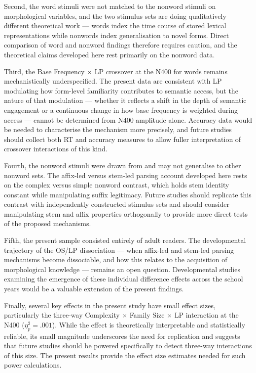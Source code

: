 \documentclass[utf8]{FrontiersinHarvard} %
\begin{document}
	Second, the word stimuli were not matched to the nonword stimuli on morphological variables, and the two stimulus sets are doing qualitatively different theoretical work --- words index the time course of stored lexical representations while nonwords index generalisation to novel forms. Direct comparison of word and nonword findings therefore requires caution, and the theoretical claims developed here rest primarily on the nonword data.
	
	Third, the Base Frequency $\times$ LP crossover at the N400 for words remains mechanistically underspecified. The present data are consistent with LP modulating how form-level familiarity contributes to semantic access, but the nature of that modulation --- whether it reflects a shift in the depth of semantic engagement or a continuous change in how base frequency is weighted during access --- cannot be determined from N400 amplitude alone. Accuracy data would be needed to characterise the mechanism more precisely, and future studies should collect both RT and accuracy measures to allow fuller interpretation of crossover interactions of this kind.
	
	Fourth, the nonword stimuli were drawn from \citet{sawiIndividualDifferencesSensitivity2016} and may not generalise to other nonword sets. The affix-led versus stem-led parsing account developed here rests on the complex versus simple nonword contrast, which holds stem identity constant while manipulating suffix legitimacy. Future studies should replicate this contrast with independently constructed stimulus sets and should consider manipulating stem and affix properties orthogonally to provide more direct tests of the proposed mechanisms.
	
	Fifth, the present sample consisted entirely of adult readers. The developmental trajectory of the OS/LP dissociation --- when affix-led and stem-led parsing mechanisms become dissociable, and how this relates to the acquisition of morphological knowledge --- remains an open question. Developmental studies examining the emergence of these individual difference effects across the school years would be a valuable extension of the present findings.
	
	Finally, several key effects in the present study have small effect sizes, particularly the three-way Complexity $\times$ Family Size $\times$ LP interaction at the N400 ($\eta^2_p = .001$). While the effect is theoretically interpretable and statistically reliable, its small magnitude underscores the need for replication and suggests that future studies should be powered specifically to detect three-way interactions of this size. The present results provide the effect size estimates needed for such power calculations.
	
\end{document}
